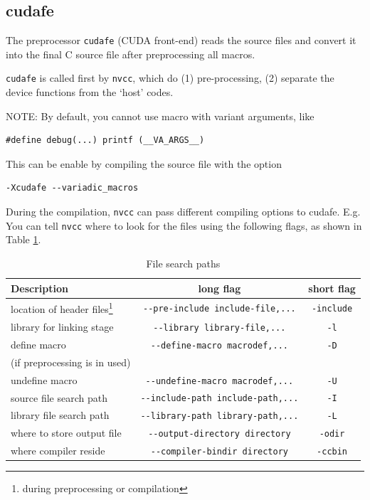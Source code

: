 \subsection{cudafe}
\label{sec:cudafe}


The preprocessor \verb!cudafe! (CUDA front-end) reads the source files and convert it into
the final C source file after preprocessing all macros. 

\verb!cudafe!  is called first by \verb!nvcc!, which do (1) pre-processing, (2)
separate the device functions from the `host' codes. 

NOTE: By default, you cannot use macro with variant arguments, like
\begin{verbatim}
#define debug(...) printf (__VA_ARGS__)
\end{verbatim}

This can be enable by compiling the source file with the option
\begin{verbatim}
-Xcudafe --variadic_macros
\end{verbatim}

During the compilation, \verb!nvcc! can pass different compiling options to
cudafe. E.g. You can tell \verb!nvcc! where to look
for the files using the following flags, as shown in Table \ref{tab:searchpath}.

\begin{table}[hbt]
\begin{center}
\caption{File search paths}
\begin{tabular}{lcc} 
  \hline
  Description & long flag & short flag \\ 
  \hline\hline
  location of header files\footnote{during preprocessing or compilation} &
  \verb!--pre-include include-file,...! & \verb!-include! \\
  library for linking stage & \verb!--library library-file,...!  &
  \verb!-l! \\
  define macro   & \verb!--define-macro macrodef,...! & \verb!-D! \\ 
  (if preprocessing is in used) & & \\
  undefine macro & \verb!--undefine-macro macrodef,...! & \verb!-U! \\
  source file search path  & \verb!--include-path include-path,...! & \verb!-I!
  \\
  library file search path & \verb!--library-path library-path,...! &
  \verb!-L! \\
  where to store output file & \verb!--output-directory directory! &
  \verb!-odir! \\
  where compiler reside & \verb!--compiler-bindir directory! &
  \verb!-ccbin! \\
  \hline
\end{tabular}
\end{center}
\label{tab:searchpath}
\end{table}

